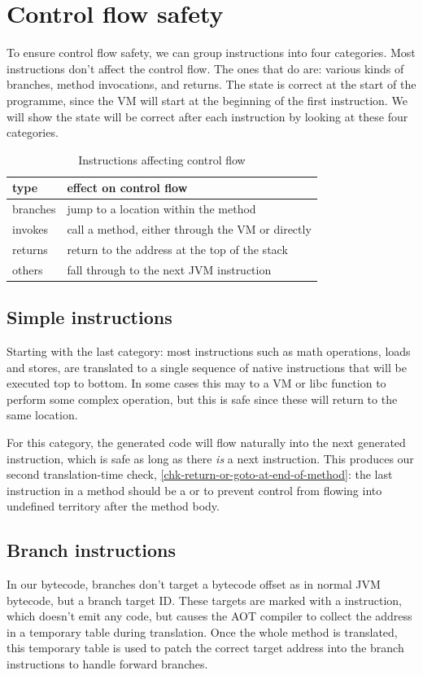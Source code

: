 \section{Control flow safety}
To ensure control flow safety, we can group instructions into four categories. Most instructions don't affect the control flow. The ones that do are: various kinds of branches, method invocations, and returns. The state is correct at the start of the programme, since the VM will start at the beginning of the first instruction. We will show the state will be correct after each instruction by looking at these four categories.

\begin{table}[H]
\centering
\caption{Instructions affecting control flow}
\label{tbl-control-flow-instructions}
\begin{tabular}{ll}
\toprule
type     & effect on control flow \\
\midrule
branches & jump to a location within the method \\
invokes  & call a method, either through the VM or directly \\
returns  & return to the address at the top of the stack \\
others   & fall through to the next JVM instruction \\
\bottomrule
\end{tabular}
\end{table}

\subsection{Simple instructions}
Starting with the last category: most instructions such as math operations, loads and stores, are translated to a single sequence of native instructions that will be executed top to bottom. In some cases this may  to a VM or libc function to perform some complex operation, but this is safe since these will return to the same location.

For this category, the generated code will flow naturally into the next generated instruction, which is safe as long as there \emph{is} a next instruction. This produces our second translation-time check, \ref{chk-return-or-goto-at-end-of-method}: the last instruction in a method should be a  or  to prevent control from flowing into undefined territory after the method body.

\subsection{Branch instructions}
In our bytecode, branches don't target a bytecode offset as in normal JVM bytecode, but a branch target ID. These targets are marked with a  instruction, which doesn't emit any code, but causes the AOT compiler to collect the address in a temporary table during translation. Once the whole method is translated, this temporary table is used to patch the correct target address into the branch instructions to handle forward branches.

